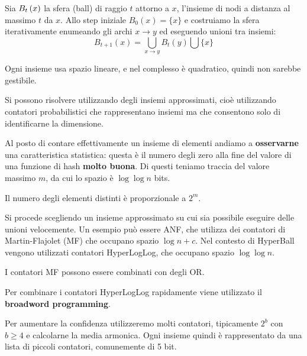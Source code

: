 \documentclass[\main/main.tex]{subfiles}
\begin{document}
\begin{multicols}{2}
\begin{definition}[Diffusione]
    Sia \(B_t\left(x\right)\) la sfera (ball) di raggio \(t\) attorno a \(x\), l'insieme di nodi a distanza al massimo \(t\) da \(x\). Allo step iniziale \(B_{0}(x)=\{x\}\) e costruiamo la sfera iterativamente enumeando gli archi \(x\rightarrow y\) ed eseguendo unioni tra insiemi:
    \[
        B_{t+1}(x)=\bigcup_{x \rightarrow y} B_{t}(y) \bigcup\{x\}
    \]
\end{definition}
\begin{observation}
    Ogni insieme usa spazio lineare, e nel complesso è quadratico, quindi non sarebbe gestibile.
\end{observation}
\begin{observation}
    Si possono risolvere utilizzando degli insiemi approssimati, cioè utilizzando contatori probabilistici che rappresentano insiemi ma che consentono solo di identificarne la dimensione.
\end{observation}
\begin{definition}
    Al posto di contare effettivamente un insieme di elementi andiamo a \textbf{osservarne} una caratteristica statistica: questa è il numero degli zero alla fine del valore di una funzione di hash \textbf{molto buona}. Di questi teniamo traccia del valore massimo \(m\), da cui lo spazio è \(\log\log n\) bits.
    
    Il numero degli elementi distinti è proporzionale a \(2^m\).
\end{definition}
\begin{definition}
    Si procede scegliendo un insieme approssimato su cui sia possibile eseguire delle unioni velocemente. Un esempio può essere ANF, che utilizza dei contatori di Martin-Flajolet (MF)  che occupano spazio \(\log n + c\). Nel contesto di HyperBall vengono utilizzati contatori HyperLogLog, che occupano spazio \(\log\log n\).
    
    I contatori MF possono essere combinati con degli OR.
    
    Per combinare i contatori HyperLogLog rapidamente viene utilizzato il \textbf{broadword programming}.
\end{definition}
\begin{observation}
    Per aumentare la confidenza utilizzeremo molti contatori, tipicamente \(2^b\) con \(b\geq 4\) e calcolarne la media armonica. Ogni insieme quindi è rappresentato da una lista di piccoli contatori, comunemente di 5 bit.
    

\end{observation}
\end{multicols}
\end{document}
